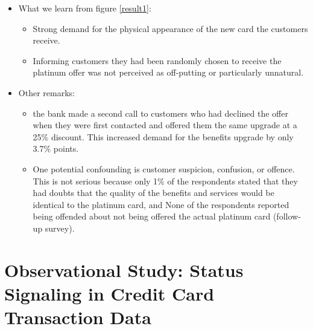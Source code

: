 \documentclass[../root]{subfiles}
\begin{document}
    \begin{itemize}
        \item What we learn from figure \ref{result1}: 
        \begin{itemize}
            \item Strong demand for the physical appearance of the new card the customers receive.
            \item Informing customers they had been randomly chosen to receive the platinum offer was not perceived as off-putting or particularly unnatural.
        \end{itemize}
        \item Other remarks:
        \begin{itemize}
            \item the bank made a second call to customers who had declined the offer when they were first contacted and offered them the same upgrade at a 25\% discount. This increased demand for the benefits upgrade by only 3.7\% points.
            \item One potential confounding is customer suspicion, confusion, or offence. This is not serious because only 1\% of the respondents stated that they had doubts that the quality of the benefits and services would be identical to the platinum card, and None of the respondents reported being offended about not being offered the actual platinum card (follow-up survey).
        \end{itemize}
    \end{itemize}


    \section{Observational Study: Status Signaling in Credit Card Transaction Data}
\end{document}
